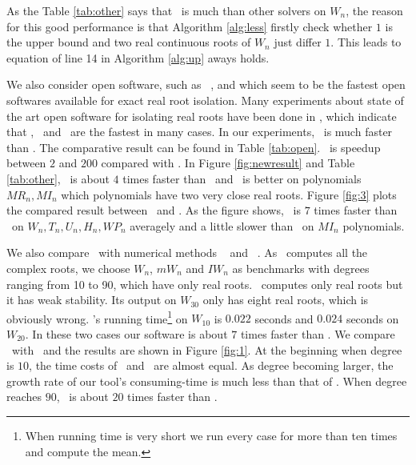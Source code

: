  {\color{red}
 	As the  Table \ref{tab:other} says that \froot\ is much than other solvers on $W_n$, the reason for this good performance is that   Algorithm \ref{alg:less} firstly check whether  $1$ is 
 	the upper bound and two real continuous roots of $W_n$ just differ $1$. This leads to equation of line 14 in Algorithm  \ref{alg:up}  aways holds.}


 We also consider open software,  such as \cf\  \cite{hemmer09}, \AND\cite{Tsigaridas2016} and \SLV\cite{kobel2016computing}  which
 seem to be the fastest  open softwares  available for exact real root isolation. Many experiments  about  state of the art open software for isolating
 real roots have been done in \cite{hemmer09,Tsigaridas2016,kobel2016computing},  which  indicate that     \cf, \AND\ and \SLV\
 are  the fastest in many cases.
 In our experiments, \froot\ is much faster than \cf. %
 The comparative result can be found in
 Table \ref{tab:open}. \froot\ is speedup between $2$ and $200$ compared with \cf.  In Figure \ref{fig:newresult} and Table \ref{tab:other}, \froot\ is about $4$ times faster than \AND\ and {\color{red}\AND\ is better on polynomials $MR_n,MI_n$ which polynomials have two very close real roots}.  Figure \ref{fig:3} plots the  compared
 	result between \froot\ and \SLV. As the figure shows, \froot\  is $7$ times faster than  \SLV\ on $W_n,T_n,U_n,H_n,WP_n$ averagely and a little slower than \SLV\ on $MI_n$ polynomials.


  We also compare \froot\  with numerical methods  \eign\ \cite{eigsolev} and \sle\ \cite{hemmer09}. As \eign\ computes all the complex roots, we choose $W_n$, $mW_n$ and $IW_n$ as benchmarks with degrees ranging from 10 to 90, which have only real roots. \sle\ computes only real roots but it has weak stability. Its output on $W_{30}$ only has eight real roots, which is obviously wrong. \sle's running time\footnote{When  running time is very short we run every case for more than ten times and compute the mean.} on $W_{10}$ is $0.022$ seconds and
 $0.024$ seconds on $W_{20}$. In these two cases our software is about $7$ times faster than \sle. We compare \froot\ with  \eign\ and the results are  shown in Figure \ref{fig:1}.
 At the beginning when degree is $10$, the time costs of \froot\ and \eign\ are
 almost equal. As degree becoming larger, the growth rate of our tool's consuming-time is much less than that of  \eign.  When degree reaches $90$, \froot\ is about $20$ times faster than \eign.


